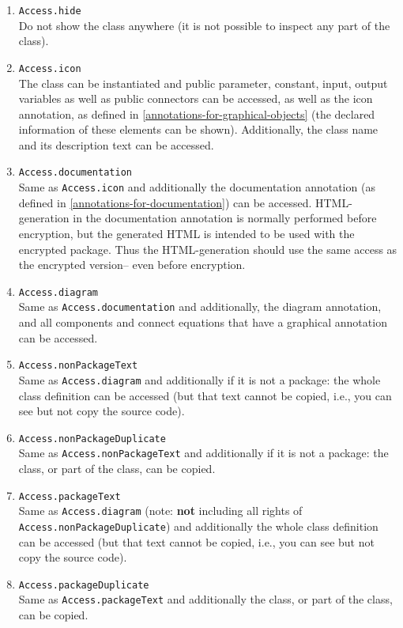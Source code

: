 \begin{enumerate}
\item
  \lstinline!Access.hide!\\
  Do not show the class anywhere (it is not possible to inspect any part
  of the class).
\item
  \lstinline!Access.icon!\textbf{\\
  }The class can be instantiated and public parameter, constant, input,
  output variables as well as public connectors can be accessed, as well
  as the icon annotation, as defined in \autoref{annotations-for-graphical-objects} (the declared
  information of these elements can be shown). Additionally, the class
  name and its description text can be accessed.
\item
  \lstinline!Access.documentation!\\
  Same as \lstinline!Access.icon! and additionally the documentation annotation (as
  defined in \autoref{annotations-for-documentation}) can be accessed. HTML-generation in the
  documentation annotation is normally performed before encryption, but
  the generated HTML is intended to be used with the encrypted package.
  Thus the HTML-generation should use the same access as the encrypted
  version-- even before encryption.
\item
  \lstinline!Access.diagram!\\
  Same as \lstinline!Access.documentation! and additionally, the diagram annotation,
  and all components and connect equations that have a graphical
  annotation can be accessed.
\item
  \lstinline!Access.nonPackageText!\\
  Same as \lstinline!Access.diagram! and additionally if it is not a package: the
  whole class definition can be accessed (but that text cannot be copied, i.e., you can see but not copy the source code).
\item
  \lstinline!Access.nonPackageDuplicate!\\
  Same as \lstinline!Access.nonPackageText! and additionally if it is not a package:
  the class, or part of the class, can be copied.
\item
  \lstinline!Access.packageText!\\
  Same as \lstinline!Access.diagram! (note: \textbf{not} including all rights of
  \lstinline!Access.nonPackageDuplicate!) and additionally the whole class
  definition can be accessed (but that text cannot be copied, i.e., you can see but not copy the source code).
\item
  \lstinline!Access.packageDuplicate!\\
  Same as \lstinline!Access.packageText! and additionally the class, or part of the
  class, can be copied.
\end{enumerate}

